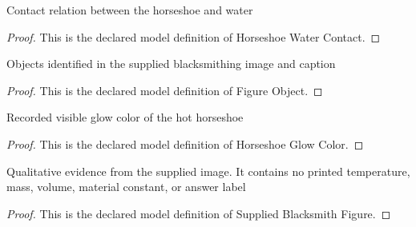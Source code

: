 \begin{definition}
  \label{def:physics:phyx-mini-0485:phyxminiproblems-problemphyxmini0485-horseshoewatercontact}
  Contact relation between the horseshoe and water
\end{definition}
\begin{proof}
  This is the declared model definition of Horseshoe Water Contact.
\end{proof}
\begin{definition}
  \label{def:physics:phyx-mini-0485:phyxminiproblems-problemphyxmini0485-figureobject}
  Objects identified in the supplied blacksmithing image and caption
\end{definition}
\begin{proof}
  This is the declared model definition of Figure Object.
\end{proof}
\begin{definition}
  \label{def:physics:phyx-mini-0485:phyxminiproblems-problemphyxmini0485-horseshoeglowcolor}
  Recorded visible glow color of the hot horseshoe
\end{definition}
\begin{proof}
  This is the declared model definition of Horseshoe Glow Color.
\end{proof}
\begin{definition}
  \label{def:physics:phyx-mini-0485:phyxminiproblems-problemphyxmini0485-suppliedblacksmithfigure}
  Qualitative evidence from the supplied image. It contains no printed temperature, mass, volume, material constant, or answer label
\end{definition}
\begin{proof}
  This is the declared model definition of Supplied Blacksmith Figure.
\end{proof}
